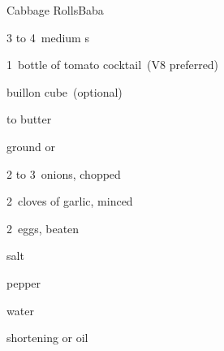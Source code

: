 \begin{recipe}{Cabbage Rolls}{Baba}{}

\begin{ingredients}
\item 3 to 4~medium s
\item 1~bottle of tomato cocktail~(V8 preferred)
\item {} 
\item buillon cube~(optional)
\item \lbs{\quarter} to \lbs{\half} butter
\item {} ground  or 
\item 2 to 3~onions, chopped
\item 2~cloves of garlic, minced
\item 2~eggs, beaten
\item salt
\item pepper
\item {} water
\item shortening or oil
\end{ingredients}


\end{recipe}
